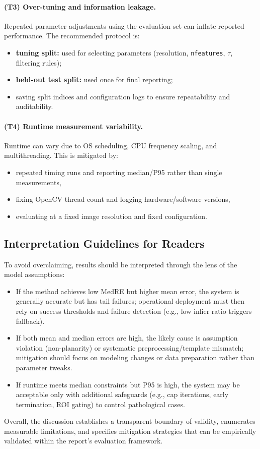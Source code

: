 \paragraph{(T3) Over-tuning and information leakage.}
Repeated parameter adjustments using the evaluation set can inflate reported performance. The recommended protocol is:
\begin{itemize}
  \item \textbf{tuning split:} used for selecting parameters (resolution, \texttt{nfeatures}, $\tau$, filtering rules);
  \item \textbf{held-out test split:} used once for final reporting;
  \item saving split indices and configuration logs to ensure repeatability and auditability.
\end{itemize}

\paragraph{(T4) Runtime measurement variability.}
Runtime can vary due to OS scheduling, CPU frequency scaling, and multithreading. This is mitigated by:
\begin{itemize}
  \item repeated timing runs and reporting median/P95 rather than single measurements,
  \item fixing OpenCV thread count and logging hardware/software versions,
  \item evaluating at a fixed image resolution and fixed configuration.
\end{itemize}

\subsection{Interpretation Guidelines for Readers}
\label{subsec:interpretation}
To avoid overclaiming, results should be interpreted through the lens of the model assumptions:
\begin{itemize}
  \item If the method achieves low MedRE but higher mean error, the system is generally accurate but has tail failures; operational deployment must then rely on success thresholds and failure detection (e.g., low inlier ratio triggers fallback).
  \item If both mean and median errors are high, the likely cause is assumption violation (non-planarity) or systematic preprocessing/template mismatch; mitigation should focus on modeling changes or data preparation rather than parameter tweaks.
  \item If runtime meets median constraints but P95 is high, the system may be acceptable only with additional safeguards (e.g., cap iterations, early termination, ROI gating) to control pathological cases.
\end{itemize}

Overall, the discussion establishes a transparent boundary of validity, enumerates measurable limitations, and specifies mitigation strategies that can be empirically validated within the report's evaluation framework.

